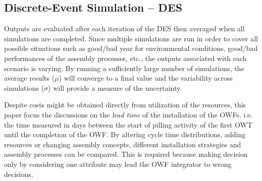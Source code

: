 \subsection{Discrete-Event Simulation -- DES}

Outputs are evaluated after each iteration of the DES then averaged when all simulations are completed. Since multiple simulations are run in order to cover all possible situations such as good/bad year for environmental conditions, good/bad performances of the assembly processes, etc., the outputs associated with each scenario is varying. By running a sufficiently large number of simulations, the average results ($\mu$) will converge to a final value and the variability across simulations ($\sigma$) will provide a measure of the uncertainty.

Despite costs might be obtained directly from utilization of the resources, this paper focus the discussions on the \textit{lead time} of the installation of the OWFs, i.e. the time measured in days between the start of pilling activity of the first OWT until the completion of the OWF. By altering cycle time distributions, adding resources or changing assembly concepts, different installation strategies and assembly processes can be compared. This is required because making decision only by considering one attribute may lead the OWF integrator to wrong decisions.


